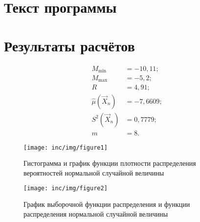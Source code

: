 \documentclass[a4paper,oneside,12pt]{extreport}
\begin{document}
\pagebreak
\section{Текст программы}



\pagebreak
\section{Результаты расчётов}

\begin{align*}
	M_{\min}          &= -10,11; \\
	M_{\max}          &= -5,2;   \\
	R                 &= 4,91;   \\
	\hat\mu(\vec X_n) &= -7,6609;\\
	S^2(\vec X_n)     &= 0,7779; \\
	m                 &= 8.
\end{align*}

\begin{figure}[H]
	\centering
	\texttt{[image: inc/img/figure1]}
	\caption{Гистограмма и график функции плотности распределения вероятностей нормальной случайной величины}
\end{figure}

\begin{figure}[H]
	\centering
	\texttt{[image: inc/img/figure2]}
	\caption{График выборочной функции распределения и функции распределения нормальной случайной величины}
\end{figure}
\end{document}

